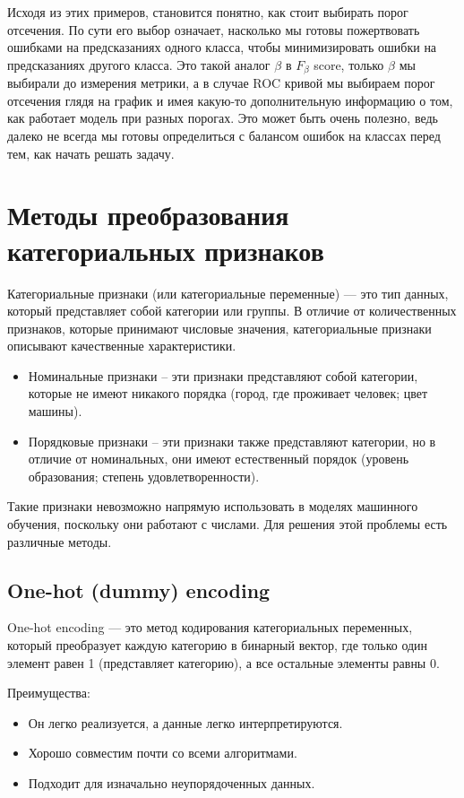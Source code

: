 Исходя из этих примеров, становится понятно, как стоит выбирать порог отсечения. По сути его выбор означает, насколько мы готовы пожертвовать ошибками на предсказаниях одного класса, чтобы минимизировать ошибки на предсказаниях другого класса.
Это такой аналог $\beta$ в $F_{\beta}$ score, только $\beta$ мы выбирали до измерения метрики, а в случае ROC кривой мы выбираем порог отсечения глядя на график и имея какую-то дополнительную информацию о том, как работает модель при разных порогах.
Это может быть очень полезно, ведь далеко не всегда мы готовы определиться с балансом ошибок на классах перед тем, как начать решать задачу.

\section{Методы преобразования категориальных признаков}

Категориальные признаки (или категориальные переменные) — это тип данных, который представляет собой категории или группы. В отличие от количественных признаков, которые принимают числовые значения, категориальные признаки описывают качественные характеристики.

\begin{itemize}
	\item Номинальные признаки -- эти признаки представляют собой категории, которые не имеют никакого порядка (город, где проживает человек; цвет машины).
	\item Порядковые признаки -- эти признаки также представляют категории, но в отличие от номинальных, они имеют естественный порядок (уровень образования; степень удовлетворенности).
\end{itemize}

Такие признаки невозможно напрямую использовать в моделях машинного обучения, поскольку они работают с числами. Для решения этой проблемы есть различные методы.

\subsection*{One-hot (dummy) encoding}

One-hot encoding — это метод кодирования категориальных переменных, который преобразует каждую категорию в бинарный вектор, где только один элемент равен 1 (представляет категорию), а все остальные элементы равны 0.

Преимущества:
\begin{itemize}
	\item Он легко реализуется, а данные легко интерпретируются.
	\item Хорошо совместим почти со всеми алгоритмами.
	\item Подходит для изначально неупорядоченных данных.
\end{itemize}

